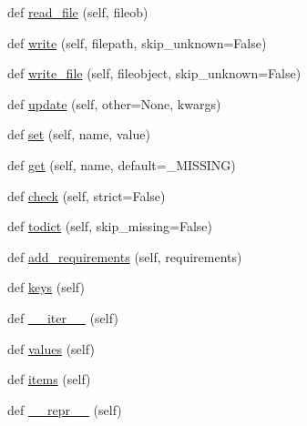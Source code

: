 \begin{DoxyCompactItemize}
\item 
def \hyperlink{classpip_1_1__vendor_1_1distlib_1_1metadata_1_1LegacyMetadata_a81f0d04e8e507d1deb4bcc912da79cb2}{read\+\_\+file} (self, fileob)
\item 
def \hyperlink{classpip_1_1__vendor_1_1distlib_1_1metadata_1_1LegacyMetadata_a6b21f09baf95f38b5c15ed3cfb6d28a2}{write} (self, filepath, skip\+\_\+unknown=False)
\item 
def \hyperlink{classpip_1_1__vendor_1_1distlib_1_1metadata_1_1LegacyMetadata_aa033975ed8087aaf281be90f828a4faa}{write\+\_\+file} (self, fileobject, skip\+\_\+unknown=False)
\item 
def \hyperlink{classpip_1_1__vendor_1_1distlib_1_1metadata_1_1LegacyMetadata_aaa801ea3f5e81ba75615504e09814b95}{update} (self, other=None, kwargs)
\item 
def \hyperlink{classpip_1_1__vendor_1_1distlib_1_1metadata_1_1LegacyMetadata_a2c135b8e7ca6361e1ebb6506e0fc5070}{set} (self, name, value)
\item 
def \hyperlink{classpip_1_1__vendor_1_1distlib_1_1metadata_1_1LegacyMetadata_a6afe175ec766743328ea8e4fe464eb31}{get} (self, name, default=\+\_\+\+M\+I\+S\+S\+I\+NG)
\item 
def \hyperlink{classpip_1_1__vendor_1_1distlib_1_1metadata_1_1LegacyMetadata_a28132a5947764193c9e166d3fe8281c9}{check} (self, strict=False)
\item 
def \hyperlink{classpip_1_1__vendor_1_1distlib_1_1metadata_1_1LegacyMetadata_a536602a48821bb0182c5425f86f1116d}{todict} (self, skip\+\_\+missing=False)
\item 
def \hyperlink{classpip_1_1__vendor_1_1distlib_1_1metadata_1_1LegacyMetadata_a5cb93b476488e133ca5fbb088bf393fd}{add\+\_\+requirements} (self, requirements)
\item 
def \hyperlink{classpip_1_1__vendor_1_1distlib_1_1metadata_1_1LegacyMetadata_ab0e7a14456749f1859007eaa600fd938}{keys} (self)
\item 
def \hyperlink{classpip_1_1__vendor_1_1distlib_1_1metadata_1_1LegacyMetadata_a3107bd40ea8767d920f542d9a337b0c1}{\+\_\+\+\_\+iter\+\_\+\+\_\+} (self)
\item 
def \hyperlink{classpip_1_1__vendor_1_1distlib_1_1metadata_1_1LegacyMetadata_a16fbb10c4986368f35f737299db137d2}{values} (self)
\item 
def \hyperlink{classpip_1_1__vendor_1_1distlib_1_1metadata_1_1LegacyMetadata_ad75ade4c3fcb143145f1e75dcb2b691d}{items} (self)
\item 
def \hyperlink{classpip_1_1__vendor_1_1distlib_1_1metadata_1_1LegacyMetadata_a368ff1d11ec3a0476833acdf59541d16}{\+\_\+\+\_\+repr\+\_\+\+\_\+} (self)
\end{DoxyCompactItemize}
